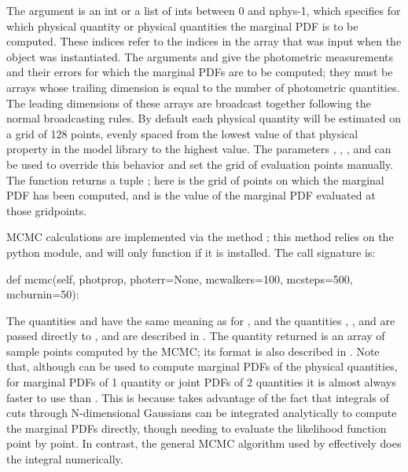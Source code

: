 \documentclass[letterpaper,10pt,english]{sphinxmanual}
\begin{document}
The argument  is an int or a list of ints between 0 and nphys-1, which specifies for which physical quantity or physical quantities the marginal PDF is to be computed. These indices refer to the indices in the  array that was input when the  object was instantiated. The arguments  and  give the photometric measurements and their errors for which the marginal PDFs are to be computed; they must be arrays whose trailing dimension is equal to the number of photometric quantities. The leading dimensions of these arrays are broadcast together following the normal broadcasting rules. By default each physical quantity will be estimated on a grid of 128 points, evenly spaced from the lowest value of that physical property in the model library to the highest value. The parameters , , , and  can be used to override this behavior and set the grid of evaluation points manually. The function returns a tuple ; here  is the grid of points on which the marginal PDF has been computed, and  is the value of the marginal PDF evaluated at those gridpoints.

MCMC calculations are implemented via the method ; this method relies on the  python module, and will only function if it is installed. The call signature is:

\begin{sphinxVerbatim}[commandchars=\\\{\}]
def mcmc(self, photprop, photerr=None, mc\PYGZus{}walkers=100,
         mc\PYGZus{}steps=500, mc\PYGZus{}burn\PYGZus{}in=50):
\end{sphinxVerbatim}

The quantities  and  have the same meaning as for , and the quantities , , and  are passed directly to , and are described in . The quantity returned is an array of sample points computed by the MCMC; its format is also described in . Note that, although  can be used to compute marginal PDFs of the physical quantities, for marginal PDFs of 1 quantity or joint PDFs of 2 quantities it is almost always faster to use  than . This is because  takes advantage of the fact that integrals of cuts through N-dimensional Gaussians can be integrated analytically to compute the marginal PDFs directly, though needing to evaluate the likelihood function point by point. In contrast, the general MCMC algorithm used by  effectively does the integral numerically.
\end{document}
